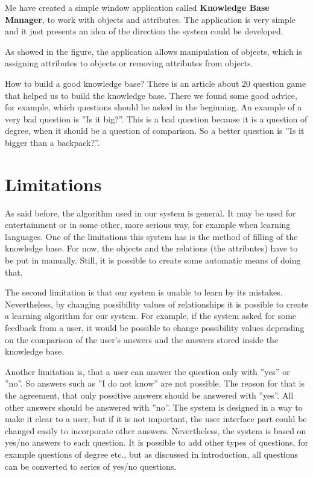 \documentclass[a4paper]{article}
\begin{document}
Me have created a simple window application called \textbf{Knowledge Base Manager}, to work with objects and attributes. The application is very simple and it just presents an idea of the direction the system could be developed.

    
As showed in the figure, the application allows manipulation of objects, which is assigning attributes to objects or removing attributes from objects.


How to build a good knowledge base? There is an article about 20 question game \citet{howToAskQuestions} that helped us to build the knowledge base. There we found some good advice, for example, which questions should be asked in the beginning. An example of a very bad question is ''Is it big?''. This is a bad question because it is a question of degree, when it should be a question of comparison. So a better question is ''Is it bigger than a backpack?''.

\section{Limitations}
As said before, the algorithm used in our system is general. It may be used for entertainment or in some other, more serious way, for example when learning languages. One of the limitations this system has is the method of filling of the knowledge base. For now, the objects and the relations (the attributes) have to be put in manually. Still, it is possible to create some automatic means of doing that.

The second limitation is that our system is unable to learn by its mistakes. Nevertheless, by changing possibility values of relationships it is possible to create a learning algorithm for our system. For example, if the system asked for some feedback from a user, it would be possible to change possibility values depending on the comparison of the user's answers and the answers stored inside the knowledge base. 

Another limitation is, that a user can answer the question only with ''yes'' or ''no''. So answers such as ''I do not know'' are not possible. The reason for that is the agreement, that only possitive answers should be answered with ''yes''. All other answers should be answered with ''no''. The system is designed in a way to make it clear to a user, but if it is not important, the user interface part could be changed easily to incorporate other answers. Nevertheless, the system is based on yes/no answers to each question. It is possible to add other types of questions, for example questions of degree etc., but as discussed in introduction, all questions can be converted to series of yes/no questions.
\end{document}
